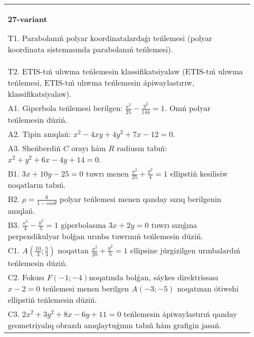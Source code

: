 \documentclass{article}
\begin{document}
\begin{tabular}{m{17cm}}
\textbf{27-variant}
\newline

T1. Parabolanıń polyar koordinatalardaǵı teńlemesi (polyar koordinata sistemasında parabolanıń teńlemesi).\\

T2. ETIS-tıń ulıwma teńlemesin klassifikatsiyalaw (ETIS-tıń ulıwma teńlemesi, ETIS-tıń ulıwma teńlemesin ápiwaylastırıw, klassifikatsiyalaw).\\

A1. Giperbola teńlemesi berilgen: $\frac{x^{2}}{25}-\frac{y^{2}}{144}=1$. Onıń polyar teńlemesin dúziń.\\

A2. Tipin anıqlań: $x^{2}-4 xy+4 y^{2}+7 x-12=0$.\\

A3. Sheńberdiń $C$ orayı hám $R$ radiusın tabıń: $x^2+y^2+6 x-4 y+14=0$.\\

B1. $3x + 10y - 25 = 0$ tuwrı menen $\frac{x^{2}}{25} + \frac{y^{2}}{4} = 1$ ellipstiń kesilisiw noqatların tabıń.\\

B2. $\rho = \frac{6}{1 - cos\theta}$ polyar teńlemesi menen qanday sızıq berilgenin anıqlań.  \\

B3. $\frac{x^{2}}{4} - \frac{y^{2}}{5} = 1$ giperbolasına $3x + 2y = 0$ tuwrı sızıǵına perpendikulyar bolǵan urınba tuwrınıń teńlemesin dúziń.\\

C1. $A(\frac{10}{3};\frac{5}{3})$ noqattan $\frac{x^{2}}{20} + \frac{y^{2}}{5} = 1$ ellipsine júrgizilgen urınbalardıń teńlemesin dúziń.  \\

C2. Fokusı $F( - 1; - 4)$noqatında bolǵan, sáykes direktrissası $x - 2 = 0$ teńlemesi menen berilgen $A( - 3; - 5)$ noqatınan ótiwshi ellipstiń teńlemesin dúziń.  \\

C3. $2x^{2} + 3y^{2} + 8x - 6y + 11 = 0$ teńlemesin ápiwaylastırıń qanday geometriyalıq obrazdı anıqlaytuǵının tabıń hám grafigin jasań.  \\

\end{tabular}
\vspace{1cm}
\end{document}
